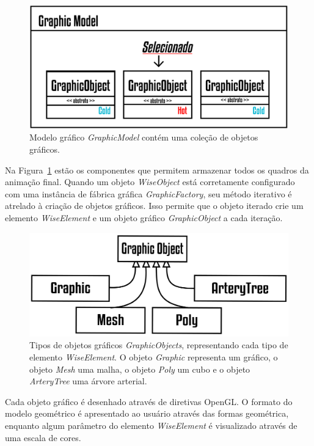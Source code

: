\begin{figure}[!htbp]
	\centering
	\includegraphics[scale=2]{Figures/GraphicModel@16x.png}
	\caption{Modelo gráfico \textit{GraphicModel} contém uma coleção de objetos gráficos.}
	\label{fig7:graphicmodel}
\end{figure}

Na Figura~\ref{fig7:graphicmodel} estão os componentes que permitem armazenar todos os quadros da animação final. Quando um objeto \textit{WiseObject} está corretamente configurado com uma instância de fábrica gráfica \textit{GraphicFactory}, seu método iterativo é atrelado à criação de objetos gráficos. Isso permite que o objeto iterado crie um elemento \textit{WiseElement} e um objeto gráfico \textit{GraphicObject} a cada iteração.

\begin{figure}[!htbp]
	\centering
	\includegraphics[scale=2]{Figures/GraphicObjects@16x.png}
	\caption{Tipos de objetos gráficos \textit{GraphicObjects}, representando cada tipo de elemento \textit{WiseElement}. O objeto \textit{Graphic} representa um gráfico, o objeto \textit{Mesh} uma malha, o objeto \textit{Poly} um cubo e o objeto \textit{ArteryTree} uma árvore arterial.}
	\label{fig7:graphicobjects}
\end{figure}

Cada objeto gráfico é desenhado através de diretivas OpenGL. O formato do modelo geométrico é apresentado ao usuário através das formas geométrica, enquanto algum parâmetro do elemento \textit{WiseElement} é visualizado através de uma escala de cores.

